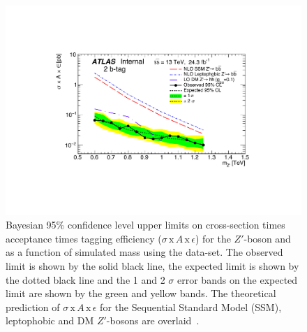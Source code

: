 \begin{figure}[!ht]
  \centering
  \includegraphics[width=0.8\linewidth, angle=0]{figs/Dibjet/LowMass/lim-zprime.pdf}
  \caption[Bayesian 95\% confidence level upper limits on
           cross-section times acceptance times tagging efficiency
           ($\sigma\,\text{x}\,\mathit{A}\,\text{x}\,\epsilon$)
           for the $Z'$-boson and as a function of simulated mass using the \lm{} data-set.
           The observed limit is shown by the solid black line, the expected limit is shown by the dotted black line
           and the 1 and 2 $\sigma$ error bands on the expected limit are shown by the green and yellow bands.
           The theoretical prediction of $\sigma\,\text{x}\,\mathit{A}\,\text{x}\,\epsilon$
           for the Sequential Standard Model (SSM), leptophobic and DM $Z'$-bosons are overlaid.]
          {Bayesian 95\% confidence level upper limits on cross-section times acceptance times tagging efficiency
            ($\sigma\,\text{x}\,\mathit{A}\,\text{x}\,\epsilon$)
             for the $Z'$-boson and as a function of simulated mass using the \lm{} data-set.
             The observed limit is shown by the solid black line, the expected limit is shown by the dotted black line
             and the 1 and 2 $\sigma$ error bands on the expected limit are shown by the green and yellow bands.
             The theoretical prediction of $\sigma\,\text{x}\,\mathit{A}\,\text{x}\,\epsilon$
             for the Sequential Standard Model (SSM), leptophobic and DM $Z'$-bosons are overlaid~\cite{dibjet-full_int}.}
  \label{fig:lim-lowmass_benchmark}
\end{figure}
